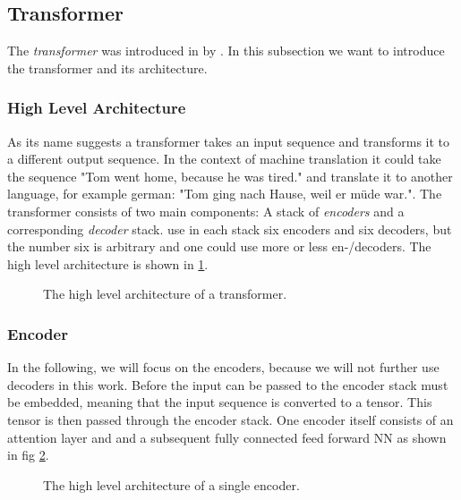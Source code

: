 
\subsection{Transformer}
\label{chp:fundamentals:sec:machine_learning:subsec:transformer}
The \textit{transformer} was introduced in \citeyear{Vaswani:2017} by \textcite{Vaswani:2017}.
In this subsection we want to introduce the transformer and its architecture.

\subsubsection{High Level Architecture}
As its name suggests a transformer takes an input sequence and transforms it to a different output sequence.
In the context of machine translation it could take the sequence "Tom went home, because he was tired." and translate it to another language, for example german: "Tom ging nach Hause, weil er müde war.".
The transformer consists of two main components: A stack of \textit{encoders} and a corresponding \textit{decoder} stack.
\Textcite{Vaswani:2017} use in each stack six encoders and six decoders, but the number six is arbitrary and one could use more or less en-/decoders.
The high level architecture is shown in \cref{fig:fundamentals:machine_learning:transformer}.
\begin{figure}[htpb]
    \centering
    
    \caption[High Level Transformer Architecture]{The high level architecture of a transformer.}\label{fig:fundamentals:machine_learning:transformer}
\end{figure}

\subsubsection{Encoder}
In the following, we will focus on the encoders, because we will not further use decoders in this work.
Before the input can be passed to the encoder stack must be embedded, meaning that the input sequence is converted to a tensor.
This tensor is then passed through the encoder stack.
One encoder itself consists of an attention layer and and a subsequent fully connected feed forward \ac{NN} as shown in fig \cref{fig:fundamentals:machine_learning:encoder}.
\pagebreak %
\begin{figure}[htpb]
    \centering
    
    \caption[High Level Encoder Architecture]{The high level architecture of a single encoder.}\label{fig:fundamentals:machine_learning:encoder}
\end{figure}

